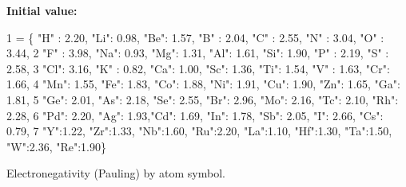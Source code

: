 {\bfseries Initial value\+:}
\begin{DoxyCode}
1 =      \{ \textcolor{stringliteral}{"H"} : 2.20, \textcolor{stringliteral}{"Li"}: 0.98, \textcolor{stringliteral}{"Be"}: 1.57, \textcolor{stringliteral}{"B"} : 2.04, \textcolor{stringliteral}{"C"} : 2.55, \textcolor{stringliteral}{"N"} : 3.04, \textcolor{stringliteral}{"O"} : 3.44,
2      \textcolor{stringliteral}{"F"} : 3.98, \textcolor{stringliteral}{"Na"}: 0.93, \textcolor{stringliteral}{"Mg"}: 1.31, \textcolor{stringliteral}{"Al"}: 1.61, \textcolor{stringliteral}{"Si"}: 1.90, \textcolor{stringliteral}{"P"} : 2.19, \textcolor{stringliteral}{"S"} : 2.58,
3      \textcolor{stringliteral}{"Cl"}: 3.16, \textcolor{stringliteral}{"K"} : 0.82, \textcolor{stringliteral}{"Ca"}: 1.00, \textcolor{stringliteral}{"Sc"}: 1.36, \textcolor{stringliteral}{"Ti"}: 1.54, \textcolor{stringliteral}{"V"} : 1.63, \textcolor{stringliteral}{"Cr"}: 1.66,
4     \textcolor{stringliteral}{"Mn"}: 1.55, \textcolor{stringliteral}{"Fe"}: 1.83, \textcolor{stringliteral}{"Co"}: 1.88, \textcolor{stringliteral}{"Ni"}: 1.91, \textcolor{stringliteral}{"Cu"}: 1.90, \textcolor{stringliteral}{"Zn"}: 1.65,  \textcolor{stringliteral}{"Ga"}: 1.81,
5     \textcolor{stringliteral}{"Ge"}: 2.01, \textcolor{stringliteral}{"As"}: 2.18, \textcolor{stringliteral}{"Se"}: 2.55, \textcolor{stringliteral}{"Br"}: 2.96, \textcolor{stringliteral}{"Mo"}: 2.16, \textcolor{stringliteral}{"Tc"}: 2.10, \textcolor{stringliteral}{"Rh"}: 2.28,
6     \textcolor{stringliteral}{"Pd"}: 2.20, \textcolor{stringliteral}{"Ag"}: 1.93,\textcolor{stringliteral}{"Cd"}: 1.69, \textcolor{stringliteral}{"In"}: 1.78, \textcolor{stringliteral}{"Sb"}: 2.05, \textcolor{stringliteral}{"I"}:  2.66, \textcolor{stringliteral}{"Cs"}: 0.79, 
7     \textcolor{stringliteral}{"Y"}:1.22, \textcolor{stringliteral}{"Zr"}:1.33, \textcolor{stringliteral}{"Nb"}:1.60, \textcolor{stringliteral}{"Ru"}:2.20, \textcolor{stringliteral}{"La"}:1.10, \textcolor{stringliteral}{"Hf"}:1.30, \textcolor{stringliteral}{"Ta"}:1.50, \textcolor{stringliteral}{"W"}:2.36, \textcolor{stringliteral}{"Re"}:1.90\}
\end{DoxyCode}


Electronegativity (Pauling) by atom symbol. 

\mbox{\label{namespacemolSimplify_1_1Classes_1_1globalvars_a75501e43d0d5a32c4a404f9bf3b7509d}} 
